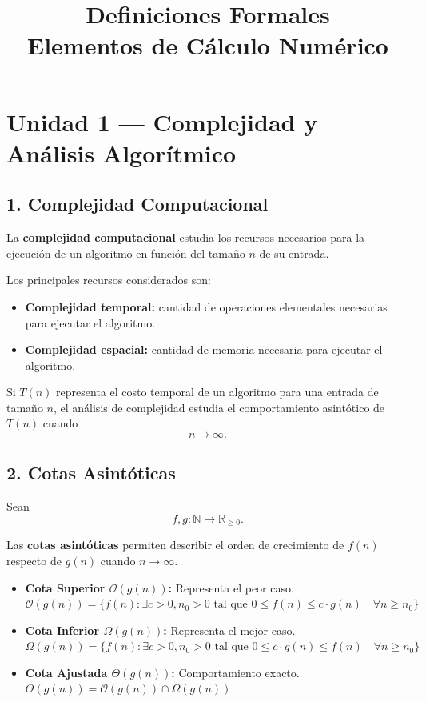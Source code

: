 \documentclass[12pt]{article}
\title{\textbf{Definiciones Formales}\\Elementos de Cálculo Numérico}
\begin{document}
\maketitle

\section*{Unidad 1 — Complejidad y Análisis Algorítmico}

\subsection*{1. Complejidad Computacional}
La \textbf{complejidad computacional} estudia los recursos necesarios
para la ejecución de un algoritmo en función del tamaño $n$ de su entrada.

Los principales recursos considerados son:

\begin{itemize}
    \item \textbf{Complejidad temporal:} cantidad de operaciones elementales
    necesarias para ejecutar el algoritmo.
    
    \item \textbf{Complejidad espacial:} cantidad de memoria necesaria para
    ejecutar el algoritmo.
\end{itemize}

Si $T(n)$ representa el costo temporal de un algoritmo para una entrada
de tamaño $n$, el análisis de complejidad estudia el comportamiento
asintótico de $T(n)$ cuando
\[
n \longrightarrow \infty.
\]


\subsection*{2. Cotas Asintóticas}
Sean
\[
f,g:\mathbb{N}\longrightarrow\mathbb{R}_{\geq 0}.
\]

Las \textbf{cotas asintóticas} permiten describir el orden de crecimiento
de $f(n)$ respecto de $g(n)$ cuando $n\to\infty$.
\begin{itemize}
    \item \textbf{Cota Superior $\mathcal{O}(g(n))$:} Representa el peor caso. \\
    $\mathcal{O}(g(n)) = \{ f(n) : \exists c > 0, n_0 > 0 \text{ tal que } 0 \le f(n) \le c \cdot g(n) \quad \forall n \ge n_0 \}$
    \item \textbf{Cota Inferior $\Omega(g(n))$:} Representa el mejor caso. \\
    $\Omega(g(n)) = \{ f(n) : \exists c > 0, n_0 > 0 \text{ tal que } 0 \le c \cdot g(n) \le f(n) \quad \forall n \ge n_0 \}$
    \item \textbf{Cota Ajustada $\Theta(g(n))$:} Comportamiento exacto. \\
    $\Theta(g(n)) = \mathcal{O}(g(n)) \cap \Omega(g(n))$
\end{itemize}
\end{document}
